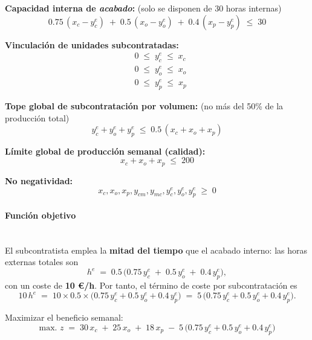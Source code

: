 \textbf{Capacidad interna de \textit{acabado}:} (solo se disponen de 30 horas internas)
\begin{equation}
    0.75\,(x_c - y_c^{e}) \;+\; 0.5\,(x_o - y_o^{e}) \;+\; 0.4\,(x_p - y_p^{e}) \;\leq\; 30
\end{equation}

\textbf{Vinculación de unidades subcontratadas:}
\begin{align}
    & 0 \;\leq\; y_c^{e} \;\leq\; x_c \\
    & 0 \;\leq\; y_o^{e} \;\leq\; x_o \\
    & 0 \;\leq\; y_p^{e} \;\leq\; x_p 
\end{align}

\textbf{Tope global de subcontratación por volumen:} (no más del 50\% de la producción total)
\begin{equation}
    y_c^{e} + y_o^{e} + y_p^{e} \;\leq\; 0.5\,(x_c + x_o + x_p)
\end{equation}

\textbf{Límite global de producción semanal (calidad):}
\begin{equation}
    x_c + x_o + x_p \;\leq\; 200
\end{equation}

\textbf{No negatividad:}
\begin{equation}
    x_c, x_o, x_p, y_{cm}, y_{mc}, y_c^{e}, y_o^{e}, y_p^{e} \;\geq\; 0
\end{equation}

\paragraph{Función objetivo}\mbox{}\\[2pt]
El subcontratista emplea la \textbf{mitad del tiempo} que el acabado interno: las horas externas totales son
\[
h^{e} \;=\; 0.5\,\big(0.75\,y_c^{e} \;+\; 0.5\,y_o^{e} \;+\; 0.4\,y_p^{e}\big),
\]
con un coste de \textbf{10 €/h}. Por tanto, el término de coste por subcontratación es
\[
10\,h^{e} \;=\; 10 \times 0.5 \times \big(0.75\,y_c^{e} + 0.5\,y_o^{e} + 0.4\,y_p^{e}\big)
\;=\; 5\,\big(0.75\,y_c^{e} + 0.5\,y_o^{e} + 0.4\,y_p^{e}\big).
\]

Maximizar el beneficio semanal:
\begin{equation}
\mbox{max. } z \;=\; 30\,x_c \;+\; 25\,x_o \;+\; 18\,x_p 
\;-\; 5\,\Big(0.75\,y_c^{e} + 0.5\,y_o^{e} + 0.4\,y_p^{e}\Big)
\end{equation}

